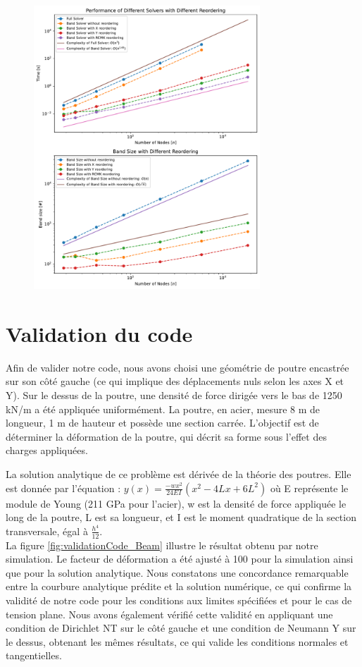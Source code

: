 \documentclass[conference]{IEEEtran}
\begin{document}
\begin{figure}[!htb]
    \centering
    \includegraphics[width=8.5cm]{Figures/solver_plot.pdf}
    \label{fig:BandFullRenum}
\end{figure}

\section{Validation du code}

Afin de valider notre code, nous avons choisi une géométrie de poutre encastrée sur son côté gauche (ce qui implique des déplacements nuls selon les axes X et Y). Sur le dessus de la poutre, une densité de force dirigée vers le bas de 1250 kN/m a été appliquée uniformément. La poutre, en acier, mesure 8 m de longueur, 1 m de hauteur et possède une section carrée. L'objectif est de déterminer la déformation de la poutre, qui décrit sa forme sous l'effet des charges appliquées.

La solution analytique de ce problème est dérivée de la théorie des poutres. Elle est donnée par l'équation : $y(x) = \frac{- w x^2}{24 E I} (x^2 - 4 L x + 6 L^2)$
où E représente le module de Young (211 GPa pour l'acier), w est la densité de force appliquée le long de la poutre, L est sa longueur, et I est le moment quadratique de la section transversale, égal à $\frac{h^4}{12}$. \\

La figure \ref{fig:validationCode_Beam} illustre le résultat obtenu par notre simulation. Le facteur de déformation a été ajusté à 100 pour la simulation ainsi que pour la solution analytique. Nous constatons une concordance remarquable entre la courbure analytique prédite et la solution numérique, ce qui confirme la validité de notre code pour les conditions aux limites spécifiées et pour le cas de tension plane. Nous avons également vérifié cette validité en appliquant une condition de Dirichlet NT sur le côté gauche et une condition de Neumann Y sur le dessus, obtenant les mêmes résultats, ce qui valide les conditions normales et tangentielles.
\end{document}
